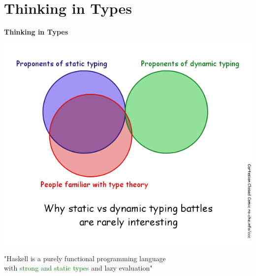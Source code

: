 \documentclass[unknownkeysallowed]{beamer}
\begin{document}
\section{Thinking in Types}
\begin{frame}

    \begin{center}
    \Large\textbf{Thinking in Types} \bigskip
    
    \includegraphics[scale=0.25]{typing.png} 
    \end{center}

\end{frame}


\begin{frame}
\begin{center}

  "Haskell is a purely functional programming language \\ with \textcolor{green}{strong and static types} and lazy evaluation"
  
\end{center}
\end{frame}

\end{document}
